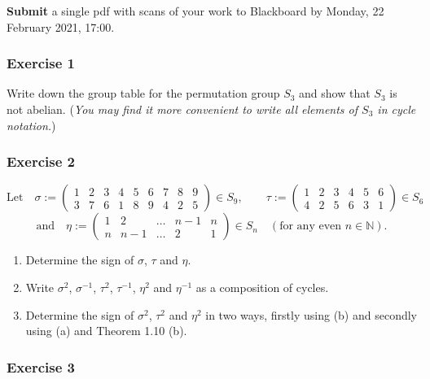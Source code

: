 \documentclass[
  12pt,
  a4paper,
  twoside]{article}
\theoremstyle{plain}
\theoremstyle{definition}
\begin{document}
\textbf{Submit} a single pdf with scans of your work to Blackboard by Monday, 22 February 2021, 17:00.

\hypertarget{exercise-1-2}{%
\subsubsection*{Exercise 1}\label{exercise-1-2}}

Write down the group table for the permutation group \(S_3\) and show that \(S_3\)
is not abelian.
(\emph{You may find it more convenient to write all elements of \(S_3\) in cycle
notation.})

\hypertarget{exercise-2-2}{%
\subsubsection*{Exercise 2}\label{exercise-2-2}}

\[\textrm{Let}\quad \sigma:=
\left(\begin{array}{ccccccccc}1&2&3&4&5&6&7&8&9\\3&7&6&1&8&9&4&2&5\end{array}\right)
\in S_9, \qquad \tau :=
\left(\begin{array}{cccccc}1&2&3&4&5&6\\4&2&5&6&3&1\end{array}\right)
\in S_6\]
\[\textrm{and} \quad \eta := \left(\begin{array}{ccccc}1& 2& \ldots & n-1 & n \\n&
n-1& \ldots & 2 & 1\end{array}\right) \in S_n \quad (\textrm{for
any even } n \in \mathbb{N}).\]

\begin{enumerate}
\def\labelenumi{(\alph{enumi})}
\item
  Determine the sign of \(\sigma\), \(\tau\) and \(\eta\).
\item
  Write \(\sigma^2\), \(\sigma^{-1}\), \(\tau^2\), \(\tau^{-1}\),
  \(\eta^2\) and \(\eta^{-1}\) as a composition of cycles.
\item
  Determine the sign of \(\sigma^2\), \(\tau^2\) and \(\eta^2\) in
  two ways, firstly using (b) and secondly using (a) and
  Theorem 1.10 (b).
\end{enumerate}

\hypertarget{exercise-3-2}{%
\subsubsection*{Exercise 3}\label{exercise-3-2}}
\end{document}

